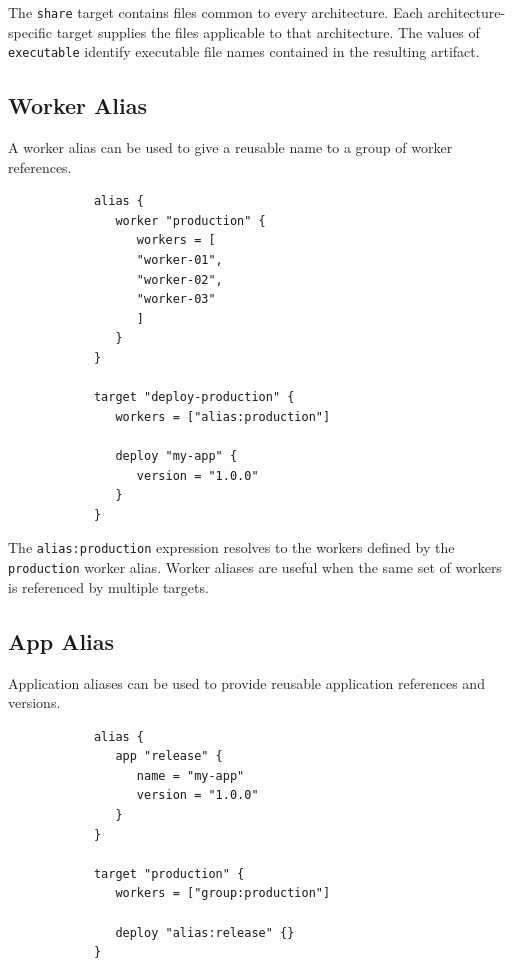 \documentclass[11pt,a4paper]{article}
\begin{document}
    The \texttt{share} target contains files common to every architecture.
    Each architecture-specific target supplies the files applicable to that architecture.
    The values of \texttt{executable} identify executable file names contained in the resulting artifact.

    \subsection{Worker Alias}\label{subsec:worker-alias2}

    A worker alias can be used to give a reusable name to a group of worker references.

    \begin{center}
        \begin{verbatim}
            alias {
               worker "production" {
                  workers = [
                  "worker-01",
                  "worker-02",
                  "worker-03"
                  ]
               }
            }

            target "deploy-production" {
               workers = ["alias:production"]

               deploy "my-app" {
                  version = "1.0.0"
               }
            }
        \end{verbatim}
    \end{center}

    The \texttt{alias:production} expression resolves to the workers defined by the \texttt{production} worker alias.
    Worker aliases are useful when the same set of workers is referenced by multiple targets.

    \subsection{App Alias}\label{subsec:app-alias2}

    Application aliases can be used to provide reusable application references and versions.

    \begin{center}
        \begin{verbatim}
            alias {
               app "release" {
                  name = "my-app"
                  version = "1.0.0"
               }
            }

            target "production" {
               workers = ["group:production"]

               deploy "alias:release" {}
            }
        \end{verbatim}
    \end{center}
\end{document}
